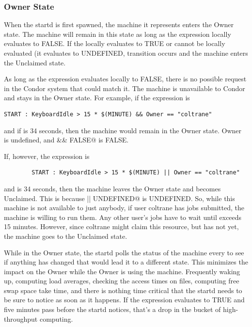 \subsubsection{\label{sec:Owner-State}
Owner State}

When the startd is first spawned, the machine it represents enters the
Owner state. 
The machine will remain in this state as long as the 
expression locally evaluates to FALSE.
If the  locally evaluates to TRUE or cannot be locally
evaluated (it evaluates to UNDEFINED, transition 
occurs and the machine enters the Unclaimed state.

As long as the  expression evaluates locally to FALSE,
there is no possible request in the Condor system that could match it.
The machine is unavailable to Condor and stays in the Owner state.
For example, if the  expression is
\begin{verbatim}
START : KeyboardIdle > 15 * $(MINUTE) && Owner == "coltrane" 
\end{verbatim}
and if  is 34 seconds,
then the machine would remain in the Owner state.
Owner is undefined, and
\verb@anything && FALSE@ is FALSE.

If, however, the  expression is
\begin{verbatim}
        START : KeyboardIdle > 15 * $(MINUTE) || Owner == "coltrane"
\end{verbatim}
and  is 34 seconds, then the machine
leaves the Owner state and becomes Unclaimed.
This is because
\verb@FALSE || UNDEFINED@ is UNDEFINED.
So, while this machine is not available to just anybody,
if user coltrane has jobs submitted, the machine is willing to run them.
Any other user's jobs have to wait
until  exceeds 15 minutes.
However, since coltrane might claim this resource,
but has not yet, the machine goes to the Unclaimed state.

While in the Owner state, the startd polls the status of the
machine every  to see if anything has changed
that would lead it to a different state.
This minimizes the impact on the Owner
while the Owner is using the machine.
Frequently waking up, computing load averages, checking the access
times on files, computing free swap space take time,
and there is nothing
time critical that the startd needs to be sure to notice as soon as it
happens.
If the  expression evaluates to TRUE and five
minutes pass before the startd notices,
that's a drop in the bucket of high-throughput computing.

